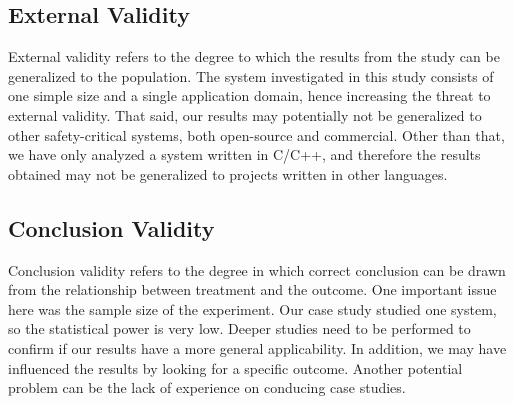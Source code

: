 
\subsection{External Validity}
\label{sub:external_validity}
External validity refers to the degree to which the results from the study can be generalized to the population\cite{Wohlin:2000:ESE:330775}. The system investigated in this study consists of one simple size and a single application domain, hence increasing the threat to external validity. That said, our results may potentially not be generalized to other safety-critical systems, both open-source and commercial. Other than that, we have only analyzed a system written in C/C++, and therefore the results obtained may not be generalized to projects written in other languages.


\subsection{Conclusion Validity} %
\label{sub:conclusion_validity}
Conclusion validity refers to the degree in which correct conclusion can be drawn from the relationship between treatment and the outcome\cite{Wohlin:2000:ESE:330775}. One important issue here was the sample size of the experiment. Our case study studied one system, so the statistical power is very low. Deeper studies need to be performed to confirm if our results have a more general applicability. In addition, we may have influenced the results by looking for a specific outcome. Another potential problem can be the lack of experience on conducing case studies.












